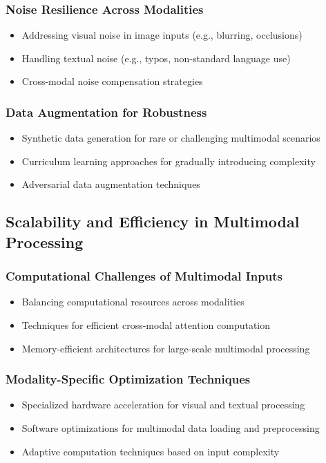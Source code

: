 \subsubsection{Noise Resilience Across Modalities}
\begin{itemize}
    \item Addressing visual noise in image inputs (e.g., blurring, occlusions)
    \item Handling textual noise (e.g., typos, non-standard language use)
    \item Cross-modal noise compensation strategies
\end{itemize}

\subsubsection{Data Augmentation for Robustness}
\begin{itemize}
    \item Synthetic data generation for rare or challenging multimodal scenarios
    \item Curriculum learning approaches for gradually introducing complexity
    \item Adversarial data augmentation techniques
\end{itemize}

\subsection{Scalability and Efficiency in Multimodal Processing}
\subsubsection{Computational Challenges of Multimodal Inputs}
\begin{itemize}
    \item Balancing computational resources across modalities
    \item Techniques for efficient cross-modal attention computation
    \item Memory-efficient architectures for large-scale multimodal processing
\end{itemize}

\subsubsection{Modality-Specific Optimization Techniques}
\begin{itemize}
    \item Specialized hardware acceleration for visual and textual processing
    \item Software optimizations for multimodal data loading and preprocessing
    \item Adaptive computation techniques based on input complexity
\end{itemize}

